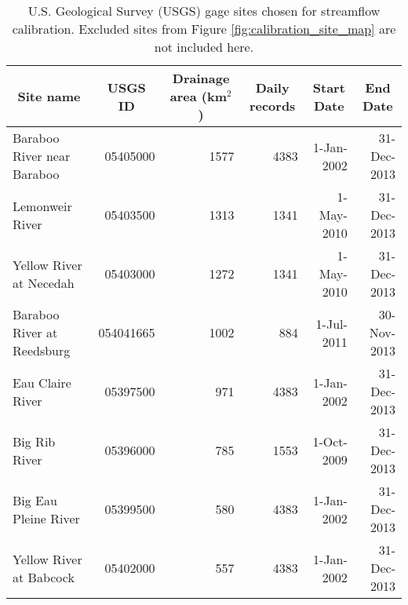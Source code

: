 \begin{table}[h]
	\caption[Gage sites chosen for streamflow calibration]{U.S. Geological Survey (USGS) gage sites chosen for streamflow calibration. Excluded sites from Figure \ref{fig:calibration_site_map} are not included here.}
	\centering
\begin{tabular}{lrrrrr}
\hline
\multicolumn{1}{c}{Site name}          & \multicolumn{1}{c}{USGS ID} & \multicolumn{1}{c}{Drainage area (km$^2$)} & \multicolumn{1}{c}{Daily records} & \multicolumn{1}{c}{Start Date} & \multicolumn{1}{c}{End Date} \\
\hline \hline
		Baraboo  River near Baraboo            & 05405000                    & 1577                                    & 4383                              & 1-Jan-2002                     & 31-Dec-2013                  \\
		Lemonweir River                        & 05403500                    & 1313                                    & 1341                              & 1-May-2010                     & 31-Dec-2013                  \\
		Yellow  River at Necedah               & 05403000                    & 1272                                    & 1341                              & 1-May-2010                     & 31-Dec-2013                  \\
		Baraboo  River at Reedsburg            & 054041665                   & 1002                                    & 884                               & 1-Jul-2011                     & 30-Nov-2013                  \\
		Eau Claire River                       & 05397500                    & 971                                     & 4383                              & 1-Jan-2002                     & 31-Dec-2013                  \\
		Big Rib River                          & 05396000                    & 785                                     & 1553                              & 1-Oct-2009                     & 31-Dec-2013                  \\
		Big Eau Pleine River                   & 05399500                    & 580                                     & 4383                              & 1-Jan-2002                     & 31-Dec-2013                  \\
		Yellow River at Babcock                & 05402000                    & 557                                     & 4383                              & 1-Jan-2002                     & 31-Dec-2013                  \\

\end{tabular}
\end{table}
